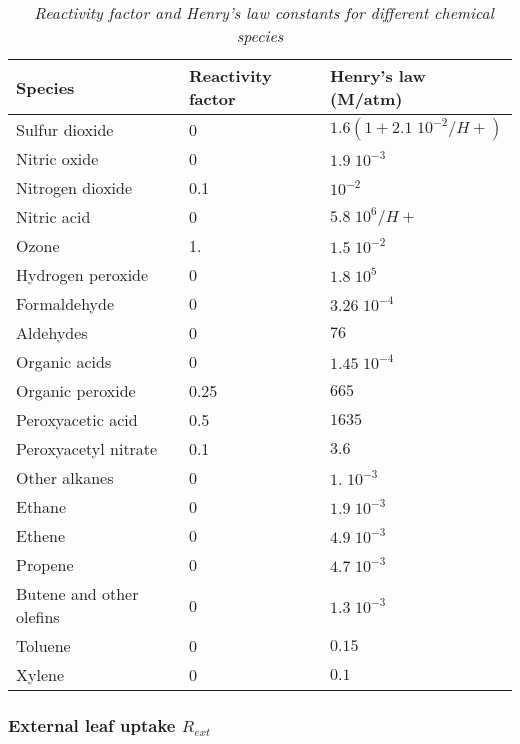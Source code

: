 \begin{table}
\begin{center}
\begin{tabular}{lll} \hline
Species         & Reactivity factor     & Henry's law (M/atm) \\ \hline 
Sulfur dioxide  & 0     & $1.6(1+2.1\; 10^{-2}/H+)$ \\
Nitric oxide    & 0     & $1.9\; 10^{-3}$        \\
Nitrogen dioxide & 0.1  & $10^{-2}$              \\
Nitric acid      & 0    & $5.8\; 10^{6}/H+$       \\
Ozone           & 1.    & $1.5\; 10^{-2}$         \\
Hydrogen peroxide  & 0  & $1.8\; 10^{5}$          \\
Formaldehyde    & 0     & $3.26\; 10^{-4}$ \\
Aldehydes       & 0     & $76$ \\
Organic acids   & 0     & $1.45\; 10^{-4}$ \\
Organic peroxide  & 0.25& $665$ \\
Peroxyacetic acid  & 0.5& $1635$ \\
Peroxyacetyl nitrate &0.1& $3.6$ \\
Other alkanes & 0       & $1.\; 10^{-3}$ \\
Ethane           & 0    & $1.9\; 10^{-3}$ \\
Ethene           & 0    & $4.9\; 10^{-3}$ \\
Propene           & 0   & $4.7\; 10^{-3}$ \\
Butene and other olefins  & 0   & $1.3\; 10^{-3}$ \\
Toluene       & 0       & $0.15$ \\
Xylene      & 0         & $0.1$ \\ 
\hline
\end{tabular}
\caption{\sl ~{Reactivity factor and Henry's law constants for different chemical species}}
\label{const}

\end{center}
\end{table}

\subsubsection*{External leaf uptake $R_{ext}$}

